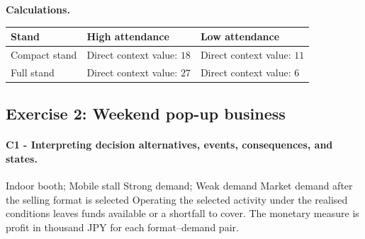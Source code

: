 	\textbf{Calculations.}
	\begin{center}
		\begin{tabularx}{\textwidth}{L>{\centering\arraybackslash}X>{\centering\arraybackslash}X}
			\toprule
			Stand & High attendance & Low attendance \\
			\midrule
			Compact stand & Direct context value: $18$ & Direct context value: $11$ \\
			Full stand & Direct context value: $27$ & Direct context value: $6$ \\
			\bottomrule
		\end{tabularx}
	\end{center}
	\begingroup\renewcommand{\CalculationStateCount}{2}
\endgroup
	
	\subsection{Exercise 2: Weekend pop-up business}
	\label{sec:problem2-weekend-pop-up-business-c1-c2}
	
	\paragraph*{C1 - Interpreting decision alternatives, events, consequences, and states.}
	\label{subsec:problem2-weekend-pop-up-business-c1}
	\DecisionElementsTable
{Indoor booth; Mobile stall}
{Strong demand; Weak demand}
{Market demand after the selling format is selected}
{Operating the selected activity under the realised conditions leaves funds available or a shortfall to cover. The monetary measure is profit in thousand JPY for each format--demand pair.}

	
	
